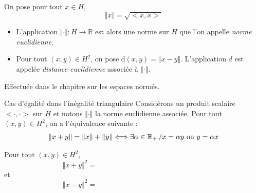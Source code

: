 \documentclass[french,11pt,twoside]{VcCours}
\begin{document}
\begin{Demonstration}{}

\vspace{15cm}
\end{Demonstration}




\begin{TheoremeDefinition}{} On pose pour tout $x \in H$,
$$ \Vert x \Vert = \sqrt{<x,x>}$$
\begin{itemize}
\item L'application $\Vert \cdot \Vert : H \rightarrow \mathbb{R}$ est alors une norme sur $H$ que l'on appelle \emph{norme euclidienne}.
\item Pour tout $(x,y) \in H^2$, on pose $\textrm{d}(x,y) = \Vert x-y \Vert$. L'application $d$ est appelée \emph{distance euclidienne} associée à $\Vert \cdot \Vert$.
\end{itemize}
\end{TheoremeDefinition} 

\begin{Demonstration}{} Effectuée dans le chapitre sur les espaces normés.
%
\end{Demonstration}

\begin{Theoreme}{Cas d'égalité dans l'inégalité triangulaire}
Considérons un produit scalaire $< \cdot , \cdot>$ sur $H$ et notons $\Vert \cdot \Vert$ la norme euclidienne associée. Pour tout $(x,y) \in H^2$, on a l'équivalence suivante :
$$ \Vert x+y \Vert = \Vert x \Vert + \Vert y \Vert \Longleftrightarrow \exists \alpha \in \mathbb{R}_{+} \, / x= \alpha y \hbox{ ou } y = \alpha x $$
\end{Theoreme}

\begin{Demonstration}{} 

\vspace{8.5cm}

\end{Demonstration}

\newpage



\begin{Remarque}{} Pour tout $(x,y) \in H^2$,
$$ \Vert x+y \Vert^2 = \phantom{testetstststtestetststststststststst}$$
et
$$ \Vert x-y \Vert^2 =  \phantom{testetstststtestetststststststststst}$$
\end{Remarque}
\end{document}

